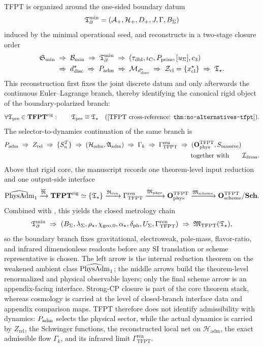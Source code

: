 TFPT is organized around the one-sided boundary datum
\[
\mathfrak T_{\partial}^{\min}=(\mathcal A_+,\mathcal H_+,D_+,J,\Gamma,B_\Sigma)
\]
induced by the minimal operational seed, and reconstructs in a two-stage closure order
\[
\begin{aligned}
\mathfrak S_{\min}
&\;\Rightarrow\;
\mathcal B_{\min}
\;\Rightarrow\;
\mathfrak T_{\partial}^{\min}
\;\Rightarrow\;
(\tau_{\mathrm{dbl}},\iota_{\mathrm C},P_{\mathrm{prim}},[u_\Sigma],c_3)\\
&\;\Rightarrow\;
d^\star_{\mathrm{disc}}
\;\Rightarrow\;
P_{\mathrm{adm}}
\;\Rightarrow\;
\mathcal M_{d^\star_{\mathrm{disc}}}
\;\Rightarrow\;
\mathcal Z_{\mathrm{cl}}=\{x^\star_{\mathrm{cl}}\}
\;\Rightarrow\;
\mathfrak T_{\star}.
\end{aligned}
\]
This reconstruction first fixes the joint discrete datum and only afterwards the continuous
Euler--Lagrange branch, thereby identifying the canonical rigid object of the boundary-polarized
branch:
\[
\forall \Tpre\in\mathbf{TFPT}^{\mathrm{rig}}:\qquad
\Tpre\cong \Tstar
\quad\text{(\TFPTxref{thm:no-alternatives-tfpt})}.
\]
The selector-to-dynamics continuation of the same branch is
\[
P_{\mathrm{adm}}
\;\Rightarrow\;
Z_{\mathrm{rel}}
\;\Rightarrow\;
\{S_n^T\}
\;\Rightarrow\;
(\mathcal H_{\mathrm{adm}},\mathfrak A_{\mathrm{adm}})
\;\Rightarrow\;
\Gamma_k
\;\Rightarrow\;
\begin{aligned}[t]
\Gamma_{\mathrm{TFPT}}^{\mathrm{ren}}
&\;\Rightarrow\;
(\mathbf O_{\mathrm{phys}}^{\mathrm{TFPT}},S_{\mathrm{massive}})\\
&\qquad\text{together with}\qquad
\mathcal I_{\mathrm{dress}}.
\end{aligned}
\]
Above that rigid core, the manuscript records one theorem-level input reduction and one output-side
interface
\[
\widehat{\mathrm{PhysAdm}}_1
\xrightarrow{\overline{\mathfrak R}}
\mathbf{TFPT}^{\mathrm{rig}}
\simeq
\{\mathfrak T_{\star}\}
\xrightarrow{\mathfrak R_{\mathrm{ren}}}
\Gamma_{\mathrm{TFPT}}^{\mathrm{ren}}
\xrightarrow{\mathfrak M_{\mathrm{phys}}}
\mathbf O_{\mathrm{phys}}^{\mathrm{TFPT}}
\xrightarrow{\mathfrak M_{\mathrm{scheme}}}
\mathbf O_{\mathrm{scheme}}^{\mathrm{TFPT}}/\mathbf{Sch}.
\]
Combined with , this yields the closed metrology chain
\[
\mathfrak T_{\partial}^{\min}
\;\Rightarrow\;
(B_\Sigma,\lambda_\Sigma,\rho_\star,\chi_{\mathrm{geo},0},\alpha_\star,\delta_{\mathrm{ph}},U_\Sigma,\Gamma_{\mathrm{TFPT}}^{\mathrm{ren}})
\;\Rightarrow\;
\mathfrak M_{\mathrm{TFPT}}(\mathfrak T_{\star}),
\]
so the boundary branch fixes gravitational, electroweak, pole-mass, flavor-ratio, and infrared
dimensionless readouts before any SI translation or scheme representative is chosen.
The left arrow is the internal reduction theorem on the weakened ambient class $\widehat{\mathrm{PhysAdm}}_1$; the
middle arrows build the theorem-level renormalized and physical observable layers; only the final
scheme arrow is an appendix-facing interface. Strong-CP closure is part of the core theorem stack,
whereas cosmology is carried at the level of closed-branch interface data and appendix comparison
maps. TFPT therefore does not identify
admissibility with dynamics: $P_{\mathrm{adm}}$ selects the physical sector, while the actual dynamics is
carried by $Z_{\mathrm{rel}}$, the Schwinger functions, the reconstructed local net on
$\mathcal H_{\mathrm{adm}}$, the exact admissible flow $\Gamma_k$, and its infrared limit
$\Gamma_{\mathrm{TFPT}}^{\mathrm{ren}}$.


